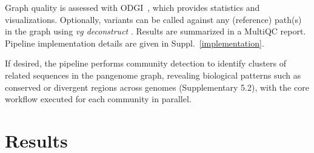 \documentclass{bioinfo}
\theoremstyle{definition}
\begin{document}
	Graph quality is assessed with ODGI~\citep{Guarracino2022}, which provides statistics and visualizations. %
	Optionally, variants can be called against any (reference) path(s) in the graph using \textit{vg deconstruct} \citep{Garrison:2018}. 
	Results are summarized in a MultiQC \citep{Ewels_2016} report. 
	Pipeline implementation details are given in Suppl.~\ref{implementation}.
	
If desired, the pipeline performs community detection to identify clusters of related sequences in the pangenome graph, revealing biological patterns such as conserved or divergent regions across genomes (Supplementary 5.2), with the core workflow executed for each community in parallel.
	\vspace{-0.6cm}
	\section{Results}
	
	
\end{document}
